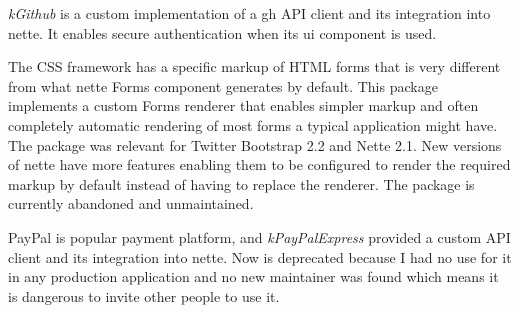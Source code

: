  \label{sec:state:github}

\textit{\gls{kGithub}} is a custom implementation of a \gls{gh} API client and its integration into \gls{nette}. It enables secure authentication when its \gls{ui} component is used.

 \label{sec:state:bootstrap-form-renderer}

The CSS framework  has a specific markup of HTML forms that is very different from what \gls{nette} Forms component generates by default. This package implements a custom Forms renderer that enables simpler markup and often completely automatic rendering of most forms a typical application might have. The package was relevant for Twitter Bootstrap 2.2 and Nette 2.1. New versions of \gls{nette} have more features enabling them to be configured to render the required markup by default instead of having to replace the renderer. The package is currently abandoned and unmaintained.

 \label{sec:state:paypal-express}

PayPal is popular payment platform, and \textit{\gls{kPayPalExpress}} provided a custom API client and its integration into \gls{nette}. Now is deprecated because I had no use for it in any production application and no new maintainer was found which means it is dangerous to invite other people to use it.


